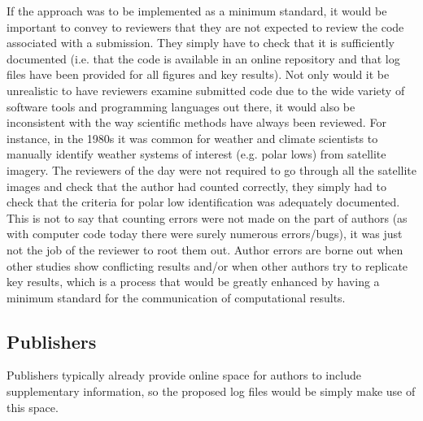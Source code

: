 If the \citet{Irving2015} approach was to be implemented as a minimum standard, it would be important to convey to reviewers that they are not expected to review the code associated with a submission. They simply have to check that it is sufficiently documented (i.e. that the code is available in an online repository and that log files have been provided for all figures and key results). Not only would it be unrealistic to have reviewers examine submitted code due to the wide variety of software tools and programming languages out there, it would also be inconsistent with the way scientific methods have always been reviewed. For instance, in the 1980s it was common for weather and climate scientists to manually identify weather systems of interest (e.g. polar lows) from satellite imagery. The reviewers of the day were not required to go through all the satellite images and check that the author had counted correctly, they simply had to check that the criteria for polar low identification was adequately documented. This is not to say that counting errors were not made on the part of authors (as with computer code today there were surely numerous errors/bugs), it was just not the job of the reviewer to root them out. Author errors are borne out when other studies show conflicting results and/or when other authors try to replicate key results, which is a process that would be greatly enhanced by having a minimum standard for the communication of computational results.

\subsection{Publishers}

Publishers typically already provide online space for authors to include supplementary information, so the proposed log files would be simply make use of this space. 